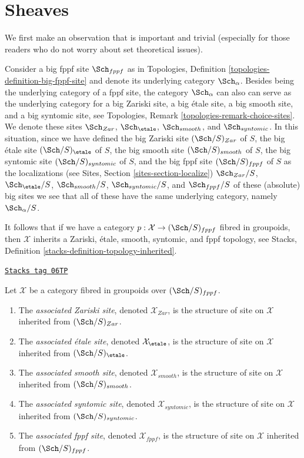 \section{Sheaves}
\label{stacks-sheaves-section-sheaves}
We first make an observation that is important and trivial
(especially for those readers who do not worry about set theoretical
issues).

\medskip\noindent
Consider a big fppf site $\Sch_{fppf}$ as in
Topologies, Definition \ref{topologies-definition-big-fppf-site}
and denote its underlying category $\Sch_\alpha$.
Besides being the underlying category of a fppf site,
the category $\Sch_\alpha$ can also can serve as the underlying
category for a big Zariski site, a big \'etale site, a big smooth site,
and a big syntomic site, see
Topologies, Remark \ref{topologies-remark-choice-sites}.
We denote these sites $\Sch_{Zar}$, $\Sch_\etale$,
$\Sch_{smooth}$, and $\Sch_{syntomic}$.
In this situation, since we have defined
the big Zariski site $(\Sch/S)_{Zar}$ of $S$,
the big \'etale site $(\Sch/S)_\etale$ of $S$,
the big smooth site $(\Sch/S)_{smooth}$ of $S$,
the big syntomic site $(\Sch/S)_{syntomic}$ of $S$, and
the big fppf site $(\Sch/S)_{fppf}$ of $S$
as the localizations (see
Sites, Section \ref{sites-section-localize})
$\Sch_{Zar}/S$, $\Sch_\etale/S$,
$\Sch_{smooth}/S$, $\Sch_{syntomic}/S$, and
$\Sch_{fppf}/S$
of these (absolute) big sites we see that all of these have the
same underlying category, namely $\Sch_\alpha/S$.

\medskip\noindent
It follows that if we have a category
$p : \mathcal{X} \to (\Sch/S)_{fppf}$ fibred in groupoids, then
$\mathcal{X}$ inherits a Zariski, \'etale, smooth, syntomic, and
fppf topology, see
Stacks, Definition \ref{stacks-definition-topology-inherited}.

\begin{definition}
\label{stacks-sheaves-definition-inherited-topologies}
\href{https://stacks.math.columbia.edu/tag/06TP}{\texttt{Stacks tag 06TP}}

Let $\mathcal{X}$ be a category fibred in groupoids over
$(\Sch/S)_{fppf}$.
\begin{enumerate}
\item The {\it associated Zariski site}, denoted $\mathcal{X}_{Zar}$,
is the structure of site on $\mathcal{X}$ inherited from
$(\Sch/S)_{Zar}$.
\item The {\it associated \'etale site}, denoted $\mathcal{X}_\etale$,
is the structure of site on $\mathcal{X}$ inherited from
$(\Sch/S)_\etale$.
\item The {\it associated smooth site}, denoted $\mathcal{X}_{smooth}$,
is the structure of site on $\mathcal{X}$ inherited from
$(\Sch/S)_{smooth}$.
\item The {\it associated syntomic site}, denoted $\mathcal{X}_{syntomic}$,
is the structure of site on $\mathcal{X}$ inherited from
$(\Sch/S)_{syntomic}$.
\item The {\it associated fppf site}, denoted $\mathcal{X}_{fppf}$,
is the structure of site on $\mathcal{X}$ inherited from
$(\Sch/S)_{fppf}$.
\end{enumerate}
\end{definition}

